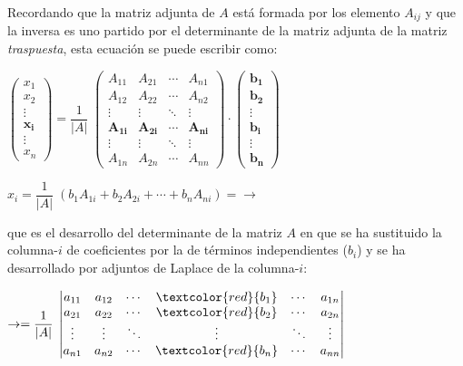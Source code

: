 Recordando que la matriz adjunta de $A$ está formada por los elemento $A_{ij}$ y que la inversa es uno partido por el determinante de la matriz adjunta de la matriz \emph{traspuesta}, esta ecuación se puede escribir como:

\vspace{3mm}

\centerline{$\left( \begin{matrix} x_1\\x_2\\ \vdots \\ \boldsymbol{ x_i} \\ \vdots \\x_n  \end{matrix} \right) =
\dfrac 1 {|A|}\;
\left( \begin{matrix} A_{11}&A_{21}& \cdots &A_{n1}\\
A_{12}&A_{22}& \cdots & A_{n2}\\
\vdots & \vdots & \ddots & \vdots \\
\boldsymbol{A_{1i}}&\boldsymbol{A_{2i}}& \cdots & \boldsymbol{A_{ni}} \\
\vdots & \vdots & \ddots & \vdots \\
A_{1n}&A_{2n}& \cdots & A_{nn}  \end{matrix} \right) 
\cdot \boldsymbol{\left( \begin{matrix} b_1\\b_2\\ \vdots \\ b_i \\ \vdots \\ b_n  \end{matrix} \right)}$}

\justify 

\vspace{2mm}
\centerline{$x_i=\dfrac 1 {|A|}\; \left( b_1A_{1i}+b_2A_{2i}+\cdots +b_nA_{ni}  \right) = \to $}

\vspace{2mm}
que es el desarrollo del determinante de la matriz $A$ en que se ha sustituido la columna-$i$ de coeficientes por la de términos independientes ($b_i$) y se ha desarrollado por adjuntos de Laplace de la columna-$i$:

\vspace{2mm}
\centerline{$\to = \dfrac 1 {|A|}\; \left| \begin{matrix} 
a_{11}& a_{12}& \cdots & \textcolor{red}{b_1} & \cdots & a_{1n} \\
a_{21}& a_{22}& \cdots & \textcolor{red}{b_2} & \cdots & a_{2n} \\
\vdots & \vdots & \ddots & \vdots & \ddots & \vdots \\
a_{n1}& a_{n2}& \cdots & \textcolor{red}{b_n} & \cdots & a_{nn} \\
 \end{matrix} \right| $}
 
